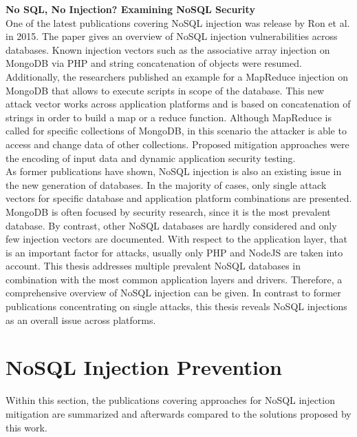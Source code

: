 \textbf{No SQL, No Injection? Examining NoSQL Security} \cite{Ron:2015} \\
One of the latest publications covering NoSQL injection was release by Ron et al. in 2015. The paper gives an overview of NoSQL injection vulnerabilities across databases. Known injection vectors such as the associative array injection on MongoDB via PHP \cite{Sullivan:2011} and string concatenation of objects \cite{Oftedal:2010} were resumed. Additionally, the researchers published an example for a MapReduce injection on MongoDB that allows to execute scripts in scope of the database. This new attack vector works across application platforms and is based on concatenation of strings in order to build a map or a reduce function. Although MapReduce is called for specific collections of MongoDB, in this scenario the attacker is able to access and change data of other collections. Proposed mitigation approaches were the encoding of input data and dynamic application security testing.\\

As former publications have shown, NoSQL injection is also an existing issue in the new generation of databases. In the majority of cases, only single attack vectors for specific database and application platform combinations are presented. MongoDB is often focused by security research, since it is the most prevalent database. By contrast, other NoSQL databases are hardly considered and only few injection vectors are documented. With respect to the application layer, that is an important factor for attacks, usually only PHP and NodeJS are taken into account. This thesis addresses multiple prevalent NoSQL databases in combination with the most common application layers and drivers. Therefore, a comprehensive overview of NoSQL injection can be given. In contrast to former publications concentrating on single attacks, this thesis reveals NoSQL injections as an overall issue across platforms.\\

\section{NoSQL Injection Prevention}
Within this section, the publications covering approaches for NoSQL injection mitigation are summarized and afterwards compared to the solutions proposed by this work. \\

